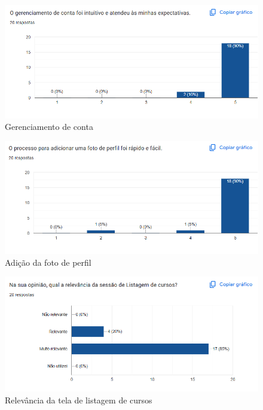 \begin{apendicesenv}
\begin{figure}[H]
    \centering
    \includegraphics[width=1.0\linewidth]{images/conta.png}
    \caption{Gerenciamento de conta}
    \label{fig:conta}
\end{figure}


\begin{figure}[H]
    \centering
    \includegraphics[width=1.0\linewidth]{images/fotoPerfil.png}
    \caption{Adição da foto de perfil}
    \label{fig:fotoPerfil}
\end{figure}

\begin{figure}[H]
    \centering
    \includegraphics[width=1.0\linewidth]{images/relevanciaCursos.png}
    \caption{Relevância da tela de listagem de cursos}
    \label{fig:relevanciaCursos}
\end{figure}


\end{apendicesenv}
